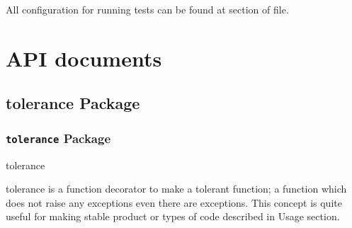\documentclass[letterpaper,10pt,english]{sphinxmanual}
\begin{document}
All configuration for running tests can be found at \code{{[}nosetests{]}} section of
 file.


\chapter{API documents}
\label{index:api-documents}\label{index:nose}

\section{tolerance Package}
\label{tolerance:tolerance-package}\label{tolerance::doc}

\subsection{\texttt{tolerance} Package}
\label{tolerance:id1}\label{tolerance:module-tolerance}
tolerance

tolerance is a function decorator to make a tolerant function; a function
which does not raise any exceptions even there are exceptions.
This concept is quite useful for making stable product or  types
of code described in Usage section.
\end{document}
